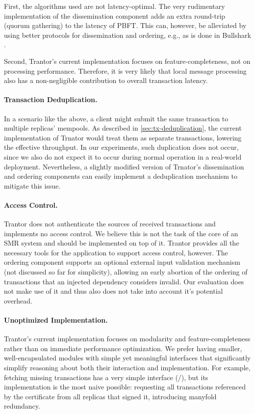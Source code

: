\documentclass{article}
\begin{document}
First, the algorithms used are not latency-optimal.
The very rudimentary implementation of the dissemination component adds an extra round-trip (quorum gathering) to the latency of PBFT.
This can, however, be alleviated by using better protocols for dissemination and ordering, e.g., as is done in Bullshark \cite{bullshark}.

Second, Trantor's current implementation focuses on feature-completeness, not on processing performance.
Therefore, it is very likely that local message processing also has a non-negligible contribution to overall transaction latency.

\paragraph{Transaction Deduplication.}
In a scenario like the above, a client might submit the same transaction to multiple replicas' mempools.
As described in \cref{sec:tx-deduplication}, the current implementation of Trnator would treat them as separate transactions,
lowering the effective throughput.
In our experiments, such duplication does not occur, since we also do not expect it to occur during normal operation in a real-world deployment.
Nevertheless, a slightly modified version of Trnator's dissemination and ordering components
can easily implement a deduplication mechanism \cite{mirbft,iss} to mitigate this issue.

\paragraph{Access Control.}
Trantor does not authenticate the sources of received transactions and implements no access control.
We believe this is not the task of the core of an SMR system and should be implemented on top of it.
Trantor provides all the necessary tools for the application to support access control, however.
The ordering component supports an optional external input validation mechanism (not discussed so far for simplicity),
allowing an early abortion of the ordering of transactions that an injected dependency considers invalid.
Our evaluation does not make use of it and thus also does not take into account it's potential overhead.

\paragraph{Unoptimized Implementation.}
Trantor's current implementation focuses on modularity and feature-completeness rather than on immediate performance optimization.
We prefer having smaller, well-encapsulated modules with simple yet meaningful interfaces
that significantly simplify reasoning about both their interaction and implementation.
For example, fetching missing transactions has a very simple interface (/),
but its implementation is the most naive possible: requesting all transactions referenced by the certificate from all replicas that signed it,
introducing manyfold redundancy.
\end{document}
